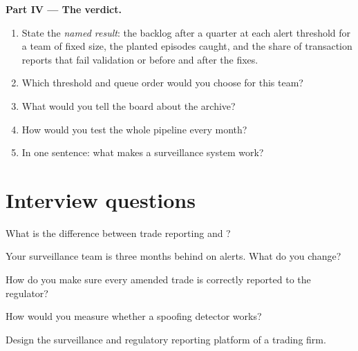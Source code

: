 \begin{problem}
\medskip\noindent\textbf{Part IV --- The verdict.}
\begin{enumerate}[resume]
\item State the \emph{named result}: the backlog after a quarter at each alert threshold for a team of fixed size, the planted episodes caught,
and the share of transaction reports that fail validation or  before and after the fixes.
\item Which threshold and queue order would you choose for this team?
\item What would you tell the board about the archive?
\item How would you test the whole pipeline every month?
\item In one sentence: what makes a surveillance system work?
\end{enumerate}
\end{problem}

\section{Interview questions}

\begin{interviewq}\label{iq:pl:surveillance-and-compliance-technology:1}
What is the difference between trade reporting and ?
\end{interviewq}

\begin{interviewq}\label{iq:pl:surveillance-and-compliance-technology:2}
Your surveillance team is three months behind on alerts. What do you change?
\end{interviewq}

\begin{interviewq}\label{iq:pl:surveillance-and-compliance-technology:3}
How do you make sure every amended trade is correctly reported to the regulator?
\end{interviewq}

\begin{interviewq}\label{iq:pl:surveillance-and-compliance-technology:4}
How would you measure whether a spoofing detector works?
\end{interviewq}

\begin{interviewq}\label{iq:pl:surveillance-and-compliance-technology:5}
Design the surveillance and regulatory reporting platform of a trading firm.
\end{interviewq}

